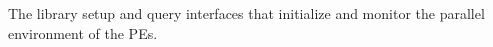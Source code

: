 The library setup and query interfaces that initialize and monitor the parallel environment of the \ac{PE}s.